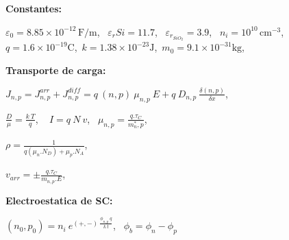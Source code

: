 \documentclass[a4paper,12pt]{article}
\newcommand{\cmmenostres}{\mathrm{cm}^{-3}}
\newenvironment{ecuaciones}[1]{
  \noindent
  \begin{lrbox}{\ecuacionesbox}
  \begin{minipage}{\linewidth}\ignorespaces
  {\footnotesize\textbf{#1:}}
} {
  \end{minipage}
  \end{lrbox}%
  \makebox[\linewidth]{%
  \fbox{\usebox{\ecuacionesbox}}%
  }
  \par
  \vspace{0.5mm}
}
\begin{document}
  \begin{ecuaciones}{Constantes}
    $\varepsilon_0=8.85\times10^{-12}\,\mathrm{F}/\mathrm{m}$, \ 
    $\varepsilon_r{Si}=11.7$, \ 
    $\varepsilon_r_{SiO_2}=3.9$, \ 
    $n_i=10^{10}\,\cmmenostres$, \ 
    $q=1.6 \times10^{-19} \mathrm{C}$,\
    $k=1.38 \times10^{-23}\mathrm{J}$,\
    $m_0=9.1 \times10^{-31} \mathrm{kg}$,
    
  \end{ecuaciones}


    \begin{ecuaciones}{Transporte de carga}
    $
    J_{n,p}=J_{n,p}^{arr} + J_{n,p}^{diff} = q \ (n,p) \ \mu_{n,p} \ E + q \ D_{n,p} \ \frac{\delta (n,p)}{\delta x}$, \ 
    
    $ \frac{D}{\mu} = \frac{k \ T}{q}
    $, \
  $ I = q\ N\ v
  $, \
  $\mu_{n,p}=\frac{ q . \tau_C  }{m^*_n,p}$,\
  
  $ \rho= \frac{1}{q(\mu_n . N_D) + \mu_p . N_A}$,\
  
  $v_{arr}=\pm \frac{q. \tau_C}{m_{n,p}.E}$,\
  
    \end{ecuaciones}
    \begin{ecuaciones}{Electroestatica de SC}
    $(n_0 , p_0) = n_i \ e^{(+,-)\ \frac{\phi_{n,p} \ q}{k \ t}}$, \ 
    $\phi_b = \phi_n - \phi_p
    $
     
     
    \end{ecuaciones}
\end{document}
